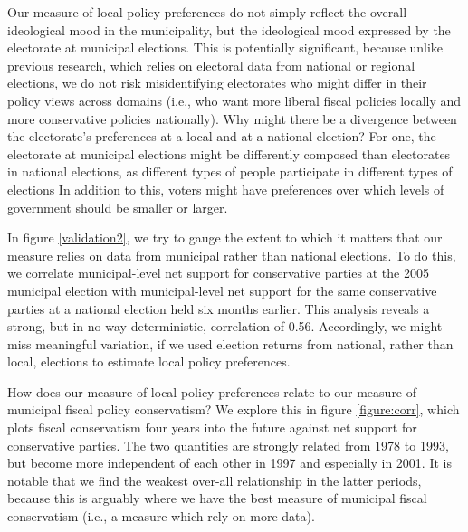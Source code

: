 \documentclass[a4paper,12pt]{article}
\begin{document}
Our measure of local policy preferences do not simply reflect the overall ideological mood in the municipality, but the ideological mood expressed by the electorate at municipal elections. This is potentially significant, because unlike previous research, which relies on electoral data from national or regional elections, we do not risk misidentifying electorates who might differ in their policy views across domains (i.e., who want more liberal fiscal policies locally and more conservative policies nationally). Why might there be a divergence between the electorate's preferences at a local and at a national election? For one, the electorate at municipal elections might be differently composed than electorates in national elections, as different types of people participate in different types of elections \citep{ansolabehere2015beyond,hansen2017social} In addition to this, voters might have preferences over which levels of government should be smaller or larger.

In figure \ref{validation2}, we try to gauge the extent to which it matters that our measure relies on data from municipal rather than national elections. To do this, we correlate  municipal-level net support for conservative parties at the 2005 municipal election with municipal-level net support for the same conservative parties at a national election held six months earlier. This analysis reveals a strong, but in no way deterministic, correlation of 0.56. Accordingly, we might miss meaningful variation, if we used election returns from national, rather than local, elections to estimate local policy preferences.

How does our measure of local policy preferences relate to our measure of municipal fiscal policy conservatism? We explore this in figure \ref{figure:corr}, which plots fiscal conservatism four years into the future against net support for conservative parties. The two quantities are strongly related from 1978 to 1993, but become more independent of each other in 1997 and especially in 2001. It is notable that we find the weakest over-all relationship in the latter periods, because this is arguably where we have the best measure of municipal fiscal conservatism (i.e., a measure which rely on more data).
\end{document}
